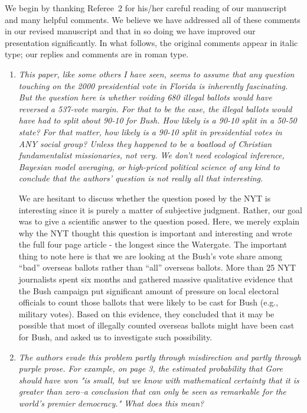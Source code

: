 \documentclass[11pt]{article}
\begin{document}
We begin by thanking Referee~2 for his/her careful reading of our
manuscript and many helpful comments. We believe we have addressed all
of these comments in our revised manuscript and that in so doing we
have improved our presentation significantly.  In what follows, the
original comments appear in italic type; our replies and comments are
in roman type.

\bigskip


\begin{enumerate}
\item {\it This paper, like some others I have seen, seems to assume
    that any question touching on the 2000 presidential vote in
    Florida is inherently fascinating.  But the question here is
    whether voiding 680 illegal ballots would have reversed a 537-vote
    margin.  For that to be the case, the illegal ballots would have
    had to split about 90-10 for Bush.  How likely is a 90-10 split in
    a 50-50 state?  For that matter, how likely is a 90-10 split in
    presidential votes in ANY social group?  Unless they happened to
    be a boatload of Christian fundamentalist missionaries, not very.
    We don't need ecological inference, Bayesian model averaging, or
    high-priced political science of any kind to conclude that the
    authors' question is not really all that interesting.}
  
  We are hesitant to discuss whether the question posed by the NYT is
  interesting since it is purely a matter of subjective judgment.
  Rather, our goal was to give a scientific answer to the question
  posed. Here, we merely explain why the NYT thought this question is
  important and interesting and wrote the full four page article - the
  longest since the Watergate. The important thing to note here is
  that we are looking at the Bush's vote share among ``bad'' overseas
  ballots rather than ``all'' overseas ballots.  More than 25 NYT
  journalists spent six months and gathered massive qualitative
  evidence that the Bush campaign put significant amount of pressure
  on local electoral officials to count those ballots that were likely
  to be cast for Bush (e.g., military votes).  Based on this evidence,
  they concluded that it may be possible that most of illegally
  counted overseas ballots might have been cast for Bush, and asked us
  to investigate such possibility.
  
\item {\it The authors evade this problem partly through misdirection
    and partly through purple prose.  For example, on page 3, the
    estimated probability that Gore should have won "is small, but we
    know with mathematical certainty that it is greater than zero--a
    conclusion that can only be seen as remarkable for the world's
    premier democracy."  What does this mean?
    
}
\end{enumerate}
\end{document}
